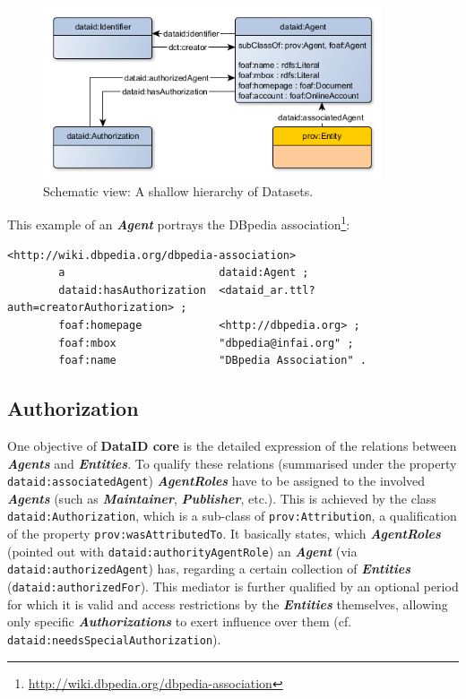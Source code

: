 \documentclass[a4paper,english,twoside,BCOR1.5cm,headsepline,DIV12,appendixprefix,final,12pt]{scrbook}
\newcommand{\core}{{\ttfamily\bfseries DataID core}\xspace}
\newcommand{\prop}[1]{{{\texttt{#1}}}}
\newcommand{\important}[1]{\textbf{\textit{#1}}}
\newcommand\footnoteurl[1]{\footnote{\scriptsize\url{#1}}}
\begin{document}
\begin{figure}[!htbp]
\centering
  \includegraphics[width=10cm]{images/ClassAgent.png}
  \caption{Schematic view: A shallow hierarchy of Datasets.}
  \label{fig:example}
\end{figure}

This example of an \important{Agent} portrays the DBpedia association\footnoteurl{http://wiki.dbpedia.org/dbpedia-association}:
\\
\begin{lstlisting}[language=ttl, captionpos=b,caption=Example of an organisation,label=lst:coresuperset,linewidth=\columnwidth,breaklines=true]
<http://wiki.dbpedia.org/dbpedia-association>
        a                        dataid:Agent ;
        dataid:hasAuthorization  <dataid_ar.ttl?auth=creatorAuthorization> ; 
        foaf:homepage            <http://dbpedia.org> ;
        foaf:mbox                "dbpedia@infai.org" ;                                                        
        foaf:name                "DBpedia Association" .
\end{lstlisting}

\subsection{Authorization} 
\label{sec:coreauthorization}
One objective of \core is the detailed expression of the relations between \important{Agents} and \important{Entities}. To qualify these relations (summarised under the property \prop{dataid:associatedAgent}) \important{AgentRoles} have to be assigned to the involved \important{Agents} (such as \important{Maintainer}, \important{Publisher}, etc.). This is achieved by the class \prop{dataid:Authorization}, which is a sub-class of \prop{prov:Attribution}, a qualification of the property \prop{prov:wasAttributedTo}. It basically states, which \important{AgentRoles} (pointed out with \prop{dataid:authorityAgentRole}) an \important{Agent} (via \prop{dataid:authorizedAgent}) has, regarding a certain collection of \important{Entities} (\prop{dataid:authorizedFor}). This mediator is further qualified by an optional period for which it is valid and access restrictions by the \important{Entities} themselves, allowing only specific \important{Authorizations} to exert influence over them (cf. \prop{dataid:needsSpecialAuthorization}). 
\end{document}
